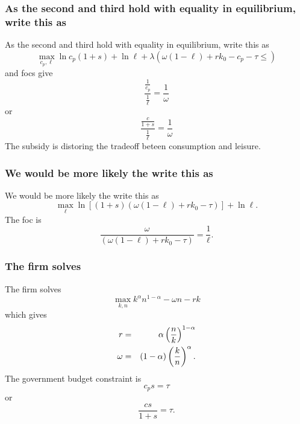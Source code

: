 \documentclass[aspectratio=169]{ltx-talk}
\begin{document}
\begin{frame}
\frametitle{As the second and third hold with equality in equilibrium, write this as}
As the second and third hold with equality in equilibrium, write this as%
\begin{equation*}
\underset{c_{p},\ell }{\max }\ln c_{p}\left( 1+s\right) +\ln \ell +\lambda
\left( \omega \left( 1-\ell \right) +rk_{0}-c_{p}-\tau \leq \right)
\end{equation*}%
and focs give 
\begin{equation*}
\frac{\frac{1}{c_{p}}}{\frac{1}{\ell }}=\frac{1}{\omega }
\end{equation*}%
or%
\begin{equation*}
\frac{\frac{c}{1+s}}{\frac{1}{\ell }}=\frac{1}{\omega }
\end{equation*}%
The subsidy is distoring the tradeoff beteen consumption and leisure.
\end{frame}

\begin{frame}
\frametitle{We would be more likely the write this as}
We would be more likely the write this as 
\begin{equation*}
\underset{\ell }{\max }\ln \left[ \left( 1+s\right) \left( \omega \left(
1-\ell \right) +rk_{0}-\tau \right) \right] +\ln \ell .
\end{equation*}%
The foc is 
\begin{equation}
\frac{\omega }{\left( \omega \left( 1-\ell \right) +rk_{0}-\tau \right) }=%
\frac{1}{\ell }.  \label{nfoc}
\end{equation}%
\end{frame}

\begin{frame}
\frametitle{The firm solves}
The firm solves%
\begin{equation*}
\underset{k,n}{\max }k^{\alpha }n^{1-\alpha }-\omega n-rk
\end{equation*}%
which gives 
\begin{eqnarray}
r &=&\alpha \left( \frac{n}{k}\right) ^{1-\alpha }  \label{wages} \\
\omega &=&\left( 1-\alpha \right) \left( \frac{k}{n}\right) ^{\alpha }. 
\notag
\end{eqnarray}%
The government budget constraint is%
\begin{equation*}
c_{p}s=\tau
\end{equation*}%
or 
\begin{equation}
\frac{cs}{1+s}=\tau .  \label{bud2}
\end{equation}%
\end{frame}
\end{document}
